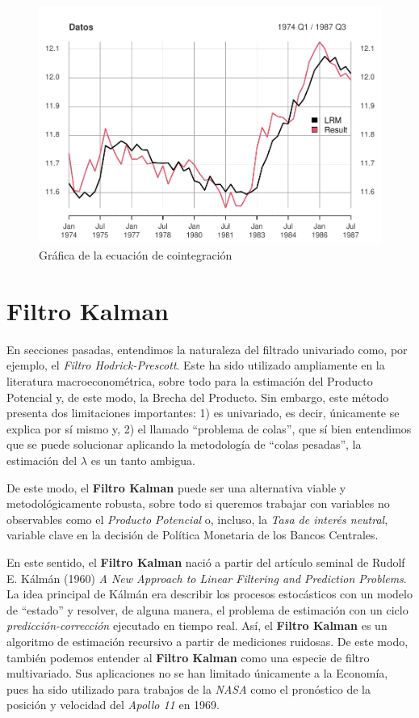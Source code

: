 \documentclass[
]{book}
\begin{document}
\begin{figure}

{\centering \includegraphics[width=0.95\linewidth]{Notas-Series-Tiempo_files/figure-latex/fig92-1} 

}

\caption{Gráfica de la ecuación de cointegración}\label{fig:fig92}
\end{figure}

\hypertarget{filtro-kalman}{%
\section{Filtro Kalman}\label{filtro-kalman}}

En secciones pasadas, entendimos la naturaleza del filtrado univariado como, por ejemplo, el \emph{Filtro Hodrick-Prescott}. Este ha sido utilizado ampliamente en la literatura macroeconométrica, sobre todo para la estimación del Producto Potencial y, de este modo, la Brecha del Producto. Sin embargo, este método presenta dos limitaciones importantes: 1) es univariado, es decir, únicamente se explica por sí mismo y, 2) el llamado ``problema de colas'', que sí bien entendimos que se puede solucionar aplicando la metodología de ``colas pesadas'', la estimación del \(\lambda\) es un tanto ambigua.

De este modo, el \textbf{Filtro Kalman} puede ser una alternativa viable y metodológicamente robusta, sobre todo si queremos trabajar con variables no observables como el \emph{Producto Potencial} o, incluso, la \emph{Tasa de interés neutral}, variable clave en la decisión de Política Monetaria de los Bancos Centrales.

En este sentido, el \textbf{Filtro Kalman} nació a partir del artículo seminal de Rudolf E. Kálmán (1960) \emph{A New Approach to Linear Filtering and Prediction Problems}. La idea principal de Kálmán era describir los procesos estocásticos con un modelo de ``estado'' y resolver, de alguna manera, el problema de estimación con un ciclo \emph{predicción-corrección} ejecutado en tiempo real. Así, el \textbf{Filtro Kalman} es un algoritmo de estimación recursivo a partir de mediciones ruidosas. De este modo, también podemos entender al \textbf{Filtro Kalman} como una especie de filtro multivariado. Sus aplicaciones no se han limitado únicamente a la Economía, pues ha sido utilizado para trabajos de la \emph{NASA} como el pronóstico de la posición y velocidad del \emph{Apollo 11} en 1969.
\end{document}
